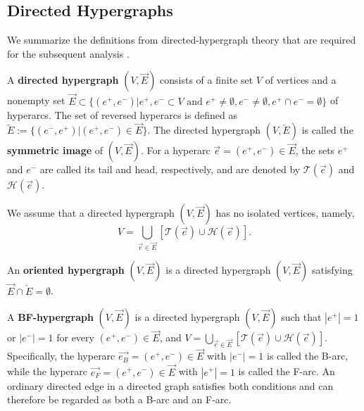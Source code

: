 \documentclass{comnet}%
\begin{document}
\subsection{\label{sec:Defs_Hypergraph} Directed Hypergraphs}
We summarize the definitions from directed-hypergraph theory that are required for the subsequent analysis \cite{Gallo1993,Nguyen1998,Bretto2013,Ausiello2017}.\\
\begin{definition}
	A \textbf{directed hypergraph} $(V, \overrightarrow{E})$ consists of a finite set $V$ of vertices and a nonempty set $\overrightarrow{E} \subset \{ (e^{+}, e^{-}) | e^{+}, e^{-} \subset V \text{\ and\ } e^{+} \not= \emptyset, e^{-} \not= \emptyset, e^{+} \cap e^{-} = \emptyset \}$ of hyperarcs. The set of reversed hyperarcs is defined as $\overleftarrow{E} := \{ (e^{-}, e^{+}) | (e^{+}, e^{-}) \in \overrightarrow{E} \}$. The directed hypergraph $(V, \overleftarrow{E})$ is called the \textbf{symmetric image} of $(V, \overrightarrow{E})$. For a hyperarc $\overrightarrow{e}= (e^{+}, e^{-}) \in \overrightarrow{E}$, the sets $e^{+}$ and $e^{-}$ are called its tail and head, respectively, and are denoted by $\mathcal{T}(\overrightarrow{e})$ and $\mathcal{H}(\overrightarrow{e})$.\\
\end{definition} 

We assume that a directed hypergraph $(V, \overrightarrow{E})$ has no isolated vertices, namely,
\begin{equation}
	V = \bigcup_{\overrightarrow{e} \in \overrightarrow{E}} [\mathcal{T}(\overrightarrow{e}) \cup \mathcal{H}(\overrightarrow{e})].
\end{equation}

\begin{definition}
	An \textbf{oriented hypergraph} $(V, \overrightarrow{E})$ is a directed hypergraph $(V, \overrightarrow{E})$ satisfying $\overrightarrow{E} \cap \overleftarrow{E} = \emptyset$.\\
\end{definition} 

\begin{definition}
	A \textbf{BF-hypergraph} $(V, \overrightarrow{E})$ is a directed hypergraph $(V, \overrightarrow{E})$ such that $|e^{+}| = 1$ or $|e^{-}| = 1$ for every $(e^{+},e^{-}) \in \overrightarrow{E}$, and $V = \bigcup_{\overrightarrow{e} \in \overrightarrow{E}} [\mathcal{T}(\overrightarrow{e}) \cup \mathcal{H}(\overrightarrow{e})]$. Specifically, the hyperarc $\overrightarrow{e_{B}} = (e^{+},e^{-}) \in \overrightarrow{E}$ with $|e^{-}| = 1$ is called the B-arc, while the hyperarc $\overrightarrow{e_{F}} = (e^{+},e^{-}) \in \overrightarrow{E}$ with $|e^{+}| = 1$ is called the F-arc. An ordinary directed edge in a directed graph satisfies both conditions and can therefore be regarded as both a B-arc and an F-arc.\\
\end{definition} 
\end{document}
